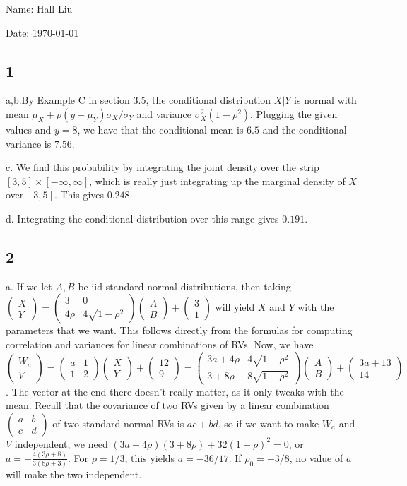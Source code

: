 \documentclass{article}
\newcommand{\openm}{\begin{pmatrix}}
\newcommand{\closem}{\end{pmatrix}}
\begin{document}
Name: Hall Liu

Date: \today 
\vspace{1.5cm}

\subsection*{1}
a,b.By Example C in section 3.5, the conditional distribution $X|Y$ is normal with mean $\mu_X+\rho(y-\mu_Y)\sigma_X/\sigma_Y$ and variance $\sigma_X^2(1-\rho^2)$. Plugging the given values and $y=8$, we have that the conditional mean is $6.5$ and the conditional variance is $7.56$.

c. We find this probability by integrating the joint density over the strip $[3,5]\times[-\infty,\infty]$, which is really just integrating up the marginal density of $X$ over $[3,5]$. This gives $0.248$.

d. Integrating the conditional distribution over this range gives $0.191$.
\subsection*{2}
a. If we let $A,B$ be iid standard normal distributions, then taking $\openm X\\Y\closem=\openm3&0\\4\rho &4\sqrt{1-\rho^2}\closem\openm A\\B\closem+\openm3\\1\closem$ will yield $X$ and $Y$ with the parameters that we want. This follows directly from the formulas for computing correlation and variances for linear combinations of RVs. Now, we have $\openm W_a\\V\closem=\openm a&1\\1&2\closem\openm X\\Y\closem+\openm12\\9\closem=\openm3a+4\rho&4\sqrt{1-\rho^2}\\3+8\rho&8\sqrt{1-\rho^2}\closem\openm A\\B\closem+\openm3a+13\\14\closem$. The vector at the end there doesn't really matter, as it only tweaks with the mean. Recall that the covariance of two RVs given by a linear combination $\openm a&b\\c&d\closem$ of two standard normal RVs is $ac+bd$, so if we want to make $W_a$ and $V$ independent, we need $(3a+4\rho)(3+8\rho)+32(1-\rho)^2=0$, or $a=-\frac{4(3\rho+8)}{3(8\rho+3)}$. For $\rho=1/3$, this yields $a=-36/17$. If $\rho_0=-3/8$, no value of $a$ will make the two independent.
\end{document}

